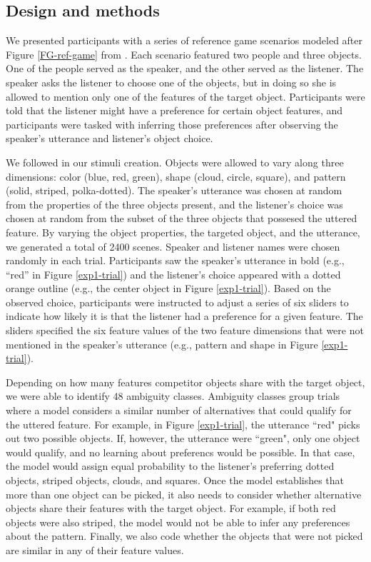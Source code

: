 \documentclass[10pt,a4paper]{article}
\begin{document}
\subsection{Design and methods}

We presented participants with a series of reference game scenarios modeled after Figure \ref{FG-ref-game} from . Each scenario featured two people and three objects. One of the people served as the speaker, and the other served as the listener. The speaker asks the listener to choose one of the objects, but in doing so she is allowed to mention only one of the features of the target object. Participants were told that the listener might have a preference for certain object features, and participants were tasked with inferring those preferences after observing the speaker's utterance and listener's object choice.

We followed  in our stimuli creation. Objects were allowed to vary along three dimensions: color (blue, red, green), shape (cloud, circle, square), and pattern (solid, striped, polka-dotted). The speaker's utterance was chosen at random from the properties of the three objects present, and the listener's choice was chosen at random from the subset of the three objects that possesed the uttered feature. By varying the object properties, the targeted object, and the utterance, we generated a total of 2400 scenes. Speaker and listener names were chosen randomly in each trial. Participants saw the speaker's utterance in bold (e.g., ``red'' in Figure \ref{exp1-trial}) and the listener's choice appeared with a dotted orange outline (e.g., the center object in Figure \ref{exp1-trial}). Based on the observed choice, participants were instructed to adjust a series of six sliders to indicate how likely it is that the listener had a preference for a given feature. The sliders specified the six feature values of the two feature dimensions that were not mentioned in the speaker's utterance (e.g., pattern and shape in Figure \ref{exp1-trial}). 

Depending on how many features competitor objects share with the target object, we were able to identify 48 ambiguity classes. Ambiguity classes group trials where a model considers a similar number of alternatives that could qualify for the uttered feature. For example, in Figure \ref{exp1-trial}, the utterance ``red" picks out two possible objects. If, however, the utterance were ``green", only one object would qualify, and no learning about preferencs would be possible. In that case, the model would assign equal probability to the listener's preferring dotted objects, striped objects, clouds, and squares. Once the model establishes that more than one object can be picked, it also needs to consider whether alternative objects share their features with the target object. For example, if both red objects were also striped, the model would not be able to infer any preferences about the pattern. Finally, we also code whether the objects that were not picked are similar in any of their feature values.
\end{document}
